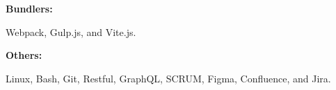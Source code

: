 \documentclass[8pt]{developercv} %
\begin{document}
\begin{minipage}[t]{0.47\textwidth}
        \begin{minipage}[t]{0.2\textwidth}
            \textbf{Bundlers:}
        \end{minipage}
        \hfill
        \begin{minipage}[t]{0.73\textwidth}
            Webpack, Gulp.js, and Vite.js.
        \end{minipage}
        \vspace{4pt}

        \begin{minipage}[t]{0.2\textwidth}
            \textbf{Others:}
        \end{minipage}
        \hfill
        \begin{minipage}[t]{0.73\textwidth}
            Linux, Bash, Git, Restful, GraphQL, SCRUM, Figma, Confluence, and Jira.
        \end{minipage}
        \vspace{4pt}

    \end{minipage}
\end{document}
